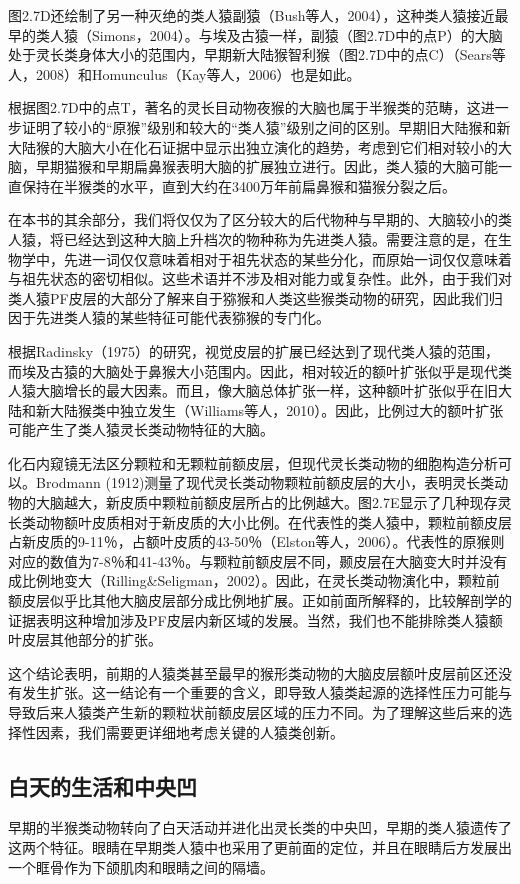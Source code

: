 图2.7D还绘制了另一种灭绝的类人猿副猿（Bush等人，2004），这种类人猿接近最早的类人猿（Simons，2004）。与埃及古猿一样，副猿（图2.7D中的点P）的大脑处于灵长类身体大小的范围内，早期新大陆猴智利猴（图2.7D中的点C）（Sears等人，2008）和Homunculus（Kay等人，2006）也是如此。

根据图2.7D中的点T，著名的灵长目动物夜猴的大脑也属于半猴类的范畴，这进一步证明了较小的“原猴”级别和较大的“类人猿”级别之间的区别。早期旧大陆猴和新大陆猴的大脑大小在化石证据中显示出独立演化的趋势，考虑到它们相对较小的大脑，早期猫猴和早期扁鼻猴表明大脑的扩展独立进行。因此，类人猿的大脑可能一直保持在半猴类的水平，直到大约在3400万年前扁鼻猴和猫猴分裂之后。

在本书的其余部分，我们将仅仅为了区分较大的后代物种与早期的、大脑较小的类人猿，将已经达到这种大脑上升档次的物种称为先进类人猿。需要注意的是，在生物学中，先进一词仅仅意味着相对于祖先状态的某些分化，而原始一词仅仅意味着与祖先状态的密切相似。这些术语并不涉及相对能力或复杂性。此外，由于我们对类人猿PF皮层的大部分了解来自于猕猴和人类这些猴类动物的研究，因此我们归因于先进类人猿的某些特征可能代表猕猴的专门化。

根据Radinsky（1975）的研究，视觉皮层的扩展已经达到了现代类人猿的范围，而埃及古猿的大脑处于鼻猴大小范围内。因此，相对较近的额叶扩张似乎是现代类人猿大脑增长的最大因素。而且，像大脑总体扩张一样，这种额叶扩张似乎在旧大陆和新大陆猴类中独立发生（Williams等人，2010）。因此，比例过大的额叶扩张可能产生了类人猿灵长类动物特征的大脑。

化石内窥镜无法区分颗粒和无颗粒前额皮层，但现代灵长类动物的细胞构造分析可以。Brodmann (1912)测量了现代灵长类动物颗粒前额皮层的大小，表明灵长类动物的大脑越大，新皮质中颗粒前额皮层所占的比例越大。图2.7E显示了几种现存灵长类动物额叶皮质相对于新皮质的大小比例。在代表性的类人猿中，颗粒前额皮层占新皮质的9-11％，占额叶皮质的43-50％（Elston等人，2006）。代表性的原猴则对应的数值为7-8％和41-43％。与颗粒前额皮层不同，颞皮层在大脑变大时并没有成比例地变大（Rilling\&Seligman，2002）。因此，在灵长类动物演化中，颗粒前额皮层似乎比其他大脑皮层部分成比例地扩展。正如前面所解释的，比较解剖学的证据表明这种增加涉及PF皮层内新区域的发展。当然，我们也不能排除类人猿额叶皮层其他部分的扩张。

这个结论表明，前期的人猿类甚至最早的猴形类动物的大脑皮层额叶皮层前区还没有发生扩张。这一结论有一个重要的含义，即导致人猿类起源的选择性压力可能与导致后来人猿类产生新的颗粒状前额皮层区域的压力不同。为了理解这些后来的选择性因素，我们需要更详细地考虑关键的人猿类创新。

\subsection{白天的生活和中央凹}
早期的半猴类动物转向了白天活动并进化出灵长类的中央凹，早期的类人猿遗传了这两个特征。眼睛在早期类人猿中也采用了更前面的定位，并且在眼睛后方发展出一个眶骨作为下颌肌肉和眼睛之间的隔墙。

